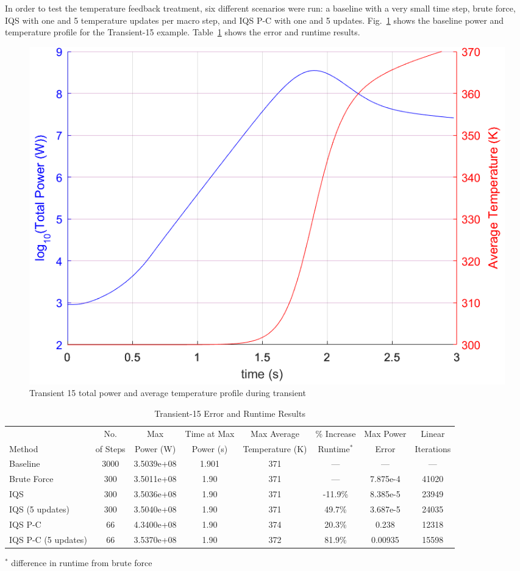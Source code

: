 \documentclass{anstrans}
\newcommand{\fig}[1]{Fig.~\ref{#1}}                      %
\newcommand{\tbl}[1]{Table~\ref{#1}}                     %
\begin{document}
In order to test the temperature feedback treatment, six different scenarios were run: a baseline with a very small time step, brute force, IQS with one and 5 temperature updates per macro step, and IQS P-C with one and 5 updates.  \fig{fig:Tran15_profile} shows the baseline power and temperature profile for the Transient-15 example.  \tbl{tab:tran15} shows the error and runtime results.

\begin{figure}[htbp!]
\centering
\includegraphics[width=\linewidth]{Tran15_profile.png}
\caption{Transient 15 total power and average temperature profile during transient}
\label{fig:Tran15_profile}
\end{figure}

\begin{table}[htb]
\begin{center}
\begin{tabular}{|l|ccccccc|}
\hline
 & No.	& Max &	Time at Max &	Max Average &	\% Increase &	Max Power & Linear	\\
Method & of Steps &	Power (W) &	Power (s) &	Temperature (K) & Runtime$^*$ & Error & Iterations \\
\hline
Baseline 			& 3000 	& 3.5039e+08 & 1.901 & 371 &	---		&	---		 & ---		\\
Brute Force 		& 300 	& 3.5011e+08 & 1.90  & 371 &	---		&	7.875e-4 & 41020	\\
IQS 				& 300	& 3.5036e+08 & 1.90  & 371 & -11.9\%	&	8.385e-5 & 23949	\\
IQS (5 updates) 	& 300 	& 3.5040e+08 & 1.90  & 371 &  49.7\%	&	3.687e-5 & 24035	\\
IQS P-C 			& 66 	& 4.3400e+08 & 1.90  & 374 &  20.3\%	&	0.238	 & 12318	\\
IQS P-C (5 updates) & 66 	& 3.5370e+08 & 1.90  & 372 &  81.9\%	&	0.00935	 & 15598	\\
\hline
\end{tabular}
\end{center}
\vspace{-3mm}
$^*$ difference in runtime from brute force 
\caption{Transient-15 Error and Runtime Results}
\label{tab:tran15}
\end{table}
\end{document}
